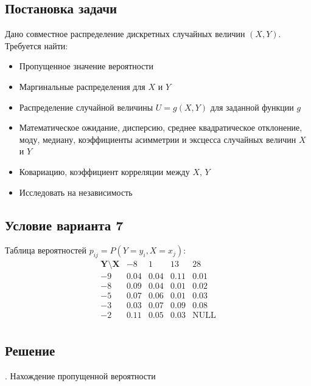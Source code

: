 \documentclass[a4paper,14pt]{extarticle}
\begin{document}
        \subsection*{Постановка задачи}
            Дано совместное распределение дискретных случайных величин $(X, Y )$. Требуется найти:
            \begin{itemize}
                \item Пропущенное значение вероятности
                \item Маргинальные распределения для $X$ и $Y$
                \item Распределение случайной величины $U = g(X, Y)$ для заданной функции $g$
                \item Математическое ожидание, дисперсию, среднее квадратическое отклонение, моду, медиану, коэффициенты асимметрии и эксцесса случайных величин $X$ и $Y$
                \item Ковариацию, коэффициент корреляции между $X$, $Y$
                \item Исследовать на независимость
            \end{itemize}
        
        \subsection*{Условие варианта 7}
            Таблица вероятностей $p_{ij} = P(Y=y_i, X=x_j)$:
            \[
                \begin{array}{c|cccc}
                    \mathbf{Y \setminus X} & -8 & 1 & 13 & 28 \\
                    \hline
                    -9 & 0.04 & 0.04 & 0.11 & 0.01  \\
                    -8 & 0.09 & 0.04 & 0.01 & 0.02  \\
                    -5 & 0.07 & 0.06 & 0.01 & 0.03  \\
                    -3 & 0.03 & 0.07 & 0.09 & 0.08  \\
                    -2 & 0.11 & 0.05 & 0.03 & \text{NULL}  \\
                \end{array}
            \]
        
        \subsection*{Решение}
            
            . Нахождение пропущенной вероятности
            
\end{document}
